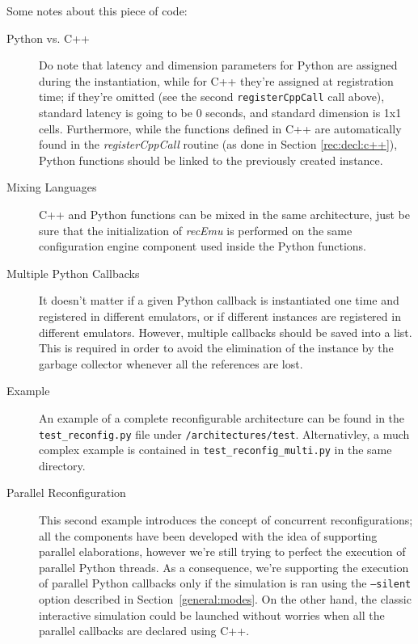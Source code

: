 Some notes about this piece of code:
\begin{description}
  \item[Python vs. C++] Do note that latency and dimension parameters for Python are assigned during the instantiation, while for C++ they're assigned at registration time; if they're omitted (see the second \texttt{registerCppCall} call above), standard latency is going to be 0 seconds, and standard dimension is 1x1 cells. Furthermore, while the functions defined in C++ are automatically found in the \mbox{\textit{registerCppCall}} routine (as done in Section \ref{rec:decl:c++}), Python functions should be linked to the previously created instance.
  \item[Mixing Languages] C++ and Python functions can be mixed in the same architecture, just be sure that the initialization of \textit{recEmu} is performed on the same configuration engine component used inside the Python functions.
  \item[Multiple Python Callbacks] It doesn't matter if a given Python callback is instantiated one time and registered in different emulators, or if different instances are registered in different emulators. However, multiple callbacks should be saved into a list. This is required in order to avoid the elimination of the instance by the garbage collector whenever all the references are lost.
  \item[Example] An example of a complete reconfigurable architecture can be found in the \verb|test_reconfig.py| file under \verb|/architectures/test|. Alternativley, a much complex example is contained in \verb|test_reconfig_multi.py| in the same directory.
  \item[Parallel Reconfiguration] This second example introduces the concept of concurrent reconfigurations; all the components have been developed with the idea of supporting parallel elaborations, however we're still trying to perfect the execution of parallel Python threads. As a consequence, we're supporting the execution of parallel Python callbacks only if the simulation is ran using the \texttt{--silent} option described in Section~\ref{general:modes}. On the other hand, the classic interactive simulation could be launched without worries when all the parallel callbacks are  declared using C++.
\end{description}
